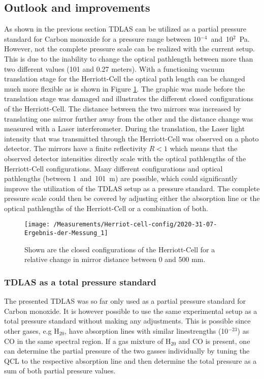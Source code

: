 \subsection{Outlook and improvements}
As shown in the previous section TDLAS can be utilized as a partial pressure standard for Carbon monoxide for a pressure range between \mbox{10$^{-4}$ and 10$^2$ Pa}. However, not the complete pressure scale can be realized with the current setup. This is due to the inability to change the optical pathlength between more than two different values (101 and 0.27 meters). With a functioning vacuum translation stage for the Herriott-Cell the optical path length can be changed much more flexible as is shown in Figure \ref{fig:Conventianal_Herriot_Cell_configurations}. The graphic was made before the translation stage was damaged and illustrates the different closed configurations of the Herriott-Cell. The distance between the two mirrors was increased by translating one mirror further away from the other and the distance change was measured with a Laser interferometer. During the translation, the Laser light intensity that was transmitted through the Herriott-Cell was observed on a photo detector. The mirrors have a finite reflectivity $R<1$ which means that the observed detector intensities directly scale with the optical pathlengths of the Herriott-Cell configurations. Many different configurations and optical pathlengths (between \mbox{1 and 101 m}) are possible, which could significantly improve the utilization of the TDLAS setup as a pressure standard. The complete pressure scale could then be covered by adjusting either the absorption line or the optical pathlengths of the Herriott-Cell or a combination of both.
\begin{figure}[H]
	\centering
	\texttt{[image: /Measurements/Herriot-cell-config/2020-31-07-Ergebnis-der-Messung\_1]}
	\caption{Shown are the closed configurations of the Herriott-Cell for a relative change in mirror distance between 0 and 500 mm. }
	\label{fig:Conventianal_Herriot_Cell_configurations}
\end{figure}
\subsubsection{TDLAS as a total pressure standard}
The presented TDLAS was so far only used as a partial pressure standard for Carbon monoxide. It is however possible to use the same experimental setup as a total pressure standard without making any adjustments. This is possible since other gases, e.g H$_20$, have absorption lines with similar linestrengths (10$^{-23}$) as CO in the same spectral region. If a gas mixture of H$_20$ and CO is present, one can determine the partial pressure of the two gasses individually by tuning the QCL to the respective absorption line and then determine the total pressure as a sum of both partial pressure values.
\newpage
